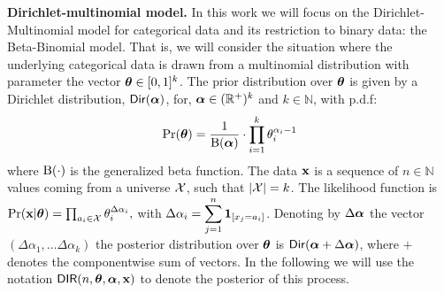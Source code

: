 \documentclass{article}
\begin{document}
\noindent \textbf{Dirichlet-multinomial model.}
In this work we will focus on the Dirichlet-Multinomial model for
categorical data and its restriction to binary data: the Beta-Binomial
model. 
That is, we will consider the situation where 
the underlying categorical data is drawn from a multinomial
distribution with parameter the vector $\boldsymbol{\theta}\in [0,1]^{k}$. The prior distribution over $\boldsymbol{\theta}$
is given by a Dirichlet distribution, $\mathsf{Dir}(\boldsymbol{\alpha})$, for,
$\boldsymbol{\alpha}\in(\mathbb{R}^{+})^{k}$ and $k\in\mathbb{N}$, with p.d.f:
\[
\Pr(\boldsymbol{\theta})=\frac{1}{\boldsymbol{\textup{B}}(\boldsymbol{\alpha})}\cdot\prod_{i=1}^{k}{\theta_i^{\alpha_i-1}}
\]
where $\boldsymbol{\textup{B}}(\cdot)$ is the generalized beta function.
The data $\textbf{x}$ is a sequence of $n\in\mathbb{N}$ values
coming from a universe $\mathcal{X}$, such that $|\mathcal{X}|=k$.
The likelihood function is
$
\Pr(\textbf{x}|\boldsymbol{\theta})=\prod_{a_i\in\mathcal{X}}\theta_{i}^{\Delta \alpha_i},
$
with $\Delta \alpha_i=\displaystyle\sum_{j=1}^{n}\mathbf{1}_{[x_j=a_i]}$.
Denoting by $\Delta\boldsymbol{\alpha}$ the vector $(\Delta\alpha_1,\dots
\Delta\alpha_k)$ the posterior distribution over $\boldsymbol{\theta}$ is
$\mathsf{Dir}(\boldsymbol{\alpha} + \Delta \boldsymbol{\alpha})$, where $+$ denotes the componentwise sum of vectors.
In the following we will use the notation $\mathsf{DIR}(n,\boldsymbol{\theta}, \boldsymbol{\alpha},
\textbf{x})$ to denote the posterior of this process.
%
\end{document}
